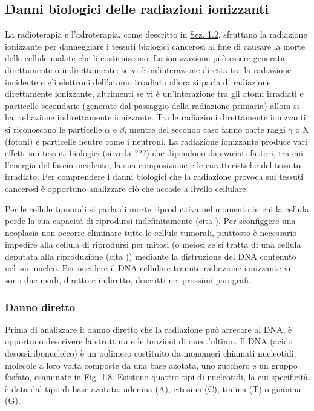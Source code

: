 \documentclass[12pt,a4paper,twoside]{report}
\begin{document}
	\subsection{Danni biologici delle radiazioni ionizzanti}
	La radioterapia e l'adroterapia, come descritto in \hyperref[sec:1.2]{Sez. 1.2}, sfruttano la radiazione ionizzante per danneggiare i tessuti biologici cancerosi al fine di causare la morte delle cellule malate che li costituiscono. La ionizzazione può essere generata direttamente o indirettamente: se vi è un'interazione diretta tra la radiazione incidente e gli elettroni dell'atomo irradiato allora si parla di radiazione direttamente ionizzante, altrimenti se vi è un'interazione tra gli atomi irradiati e particelle secondarie (generate dal passaggio della radiazione primaria) allora si ha radiazione indirettamente ionizzante. Tra le radiazioni direttamente ionizzanti si riconoscono le particelle $\alpha$ e $\beta$, mentre del secondo caso fanno parte raggi $\gamma$ o X (fotoni) e particelle neutre come i neutroni. La radiazione ionizzante produce vari effetti sui tessuti biologici (si veda \hyperref[qualcosa]{???}) che dipendono da svariati fattori, tra cui l'energia del fascio incidente, la sua composizione e le caratteristiche del tessuto irradiato. Per comprendere i danni biologici che la radiazione provoca sui tessuti cancerosi è opportuno analizzare ciò che accade a livello cellulare.
	
	Per le cellule tumorali si parla di morte riproduttiva nel momento in cui la cellula perde la sua capacità di riprodursi indefinitamente (cita
	). Per sconfiggere una neoplasia non occorre eliminare tutte le cellule tumorali, piuttosto è necessario impedire alla cellula di riprodursi per mitosi (o meiosi se si tratta di una cellula deputata alla riproduzione (cita
	)) mediante la distruzione del DNA contenuto nel suo nucleo. Per uccidere il DNA cellulare tramite radiazione ionizzante vi sono due modi, diretto e indiretto, descritti nei prossimi paragrafi.
	
	\subsubsection{Danno diretto}
	Prima di analizzare il danno diretto che la radiazione può arrecare al DNA, è opportuno descrivere la struttura e le funzioni di quest'ultimo. Il DNA (acido desossiribonucleico) è un polimero costituito da monomeri chiamati nucleotidi, molecole a loro volta composte da una base azotata, uno zucchero e un gruppo fosfato, esaminate in \hyperref[fig:nucleotide]{Fig. 1.8}. Esistono quattro tipi di nucleotidi, la cui specificità è data dal tipo di base azotata: adenina (A), citosina (C), timina (T) o guanina (G).
	
\end{document}
